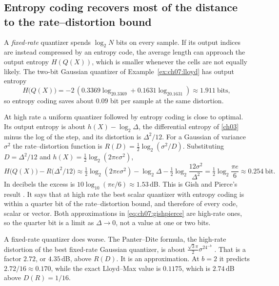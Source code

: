 \subsection*{Entropy coding recovers most of the distance to the rate--distortion bound}\label{sec:ch07:entropy}

A \emph{fixed-rate} quantizer spends $\log_2N$ bits on every sample. If its output indices are instead compressed by an entropy code, the average length can approach the output entropy $H(Q(X))$, which is smaller whenever the cells are not equally likely. The two-bit Gaussian quantizer of Example~\ref{ex:ch07:lloyd} has output entropy
\begin{equation}\label{eq:ch07:H2}
H\big(Q(X)\big)=-2\,(0.3369\log_20.3369+0.1631\log_20.1631)\approx1.911\ \text{bits},
\end{equation}
so entropy coding saves about $0.09$ bit per sample at the same distortion.

At high rate a uniform quantizer followed by entropy coding is close to optimal. Its output entropy is about $h(X)-\log_2\Delta$, the differential entropy of \cref{ch03} minus the log of the step, and its distortion is $\Delta^2/12$. For a Gaussian of variance $\sigma^2$ the rate--distortion function is $R(D)=\frac12\log_2(\sigma^2/D)$. Substituting $D=\Delta^2/12$ and $h(X)=\tfrac12\log_2(2\pi e\sigma^2)$,
\begin{equation}\label{eq:ch07:gishpierce}
H\big(Q(X)\big)-R\big(\Delta^2/12\big)\approx\tfrac12\log_2(2\pi e\sigma^2)-\log_2\Delta-\tfrac12\log_2\frac{12\sigma^2}{\Delta^2}=\tfrac12\log_2\frac{\pi e}{6}\approx0.254\ \text{bit}.
\end{equation}
In decibels the excess is $10\log_{10}(\pi e/6)\approx1.53$\,dB. This is Gish and Pierce's result \cite{gishpierce1968}. It says that at high rate the best scalar quantizer with entropy coding is within a quarter bit of the rate--distortion bound, and therefore of every code, scalar or vector. Both approximations in \cref{eq:ch07:gishpierce} are high-rate ones, so the quarter bit is a limit as $\Delta\to0$, not a value at one or two bits.

A fixed-rate quantizer does worse. The Panter--Dite formula, the high-rate distortion of the best fixed-rate Gaussian quantizer, is about $\frac{\sqrt3\pi}{2}\sigma^24^{-b}$ \cite{grayneuhoff1998}. That is a factor $2.72$, or $4.35$\,dB, above $R(D)$. It is an approximation. At $b=2$ it predicts $2.72/16\approx0.170$, while the exact Lloyd--Max value is $0.1175$, which is $2.74$\,dB above $D(R)=1/16$.

